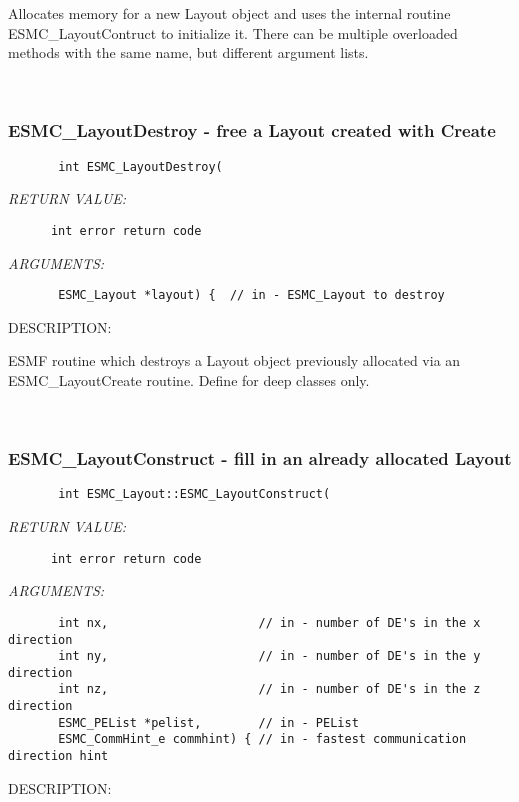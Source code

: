         Allocates memory for a new Layout
        object and uses the internal routine ESMC\_LayoutContruct to
        initialize it. There can be multiple overloaded methods with the 
        same name, but different argument lists.
   
 
\mbox{}\hrulefill\ 
 
\subsubsection{ESMC\_LayoutDestroy - free a Layout created with Create}


  
\begin{verbatim}       int ESMC_LayoutDestroy(\end{verbatim}{\em RETURN VALUE:}
\begin{verbatim}      int error return code\end{verbatim}{\em ARGUMENTS:}
\begin{verbatim}       ESMC_Layout *layout) {  // in - ESMC_Layout to destroy\end{verbatim}
{\sf DESCRIPTION:\\ }


        ESMF routine which destroys a Layout object previously allocated
        via an ESMC\_LayoutCreate routine.  Define for deep classes only.
   
 
\mbox{}\hrulefill\ 
 
\subsubsection{ESMC\_LayoutConstruct - fill in an already allocated Layout}


  
\begin{verbatim}       int ESMC_Layout::ESMC_LayoutConstruct(\end{verbatim}{\em RETURN VALUE:}
\begin{verbatim}      int error return code\end{verbatim}{\em ARGUMENTS:}
\begin{verbatim}       int nx,                     // in - number of DE's in the x direction
       int ny,                     // in - number of DE's in the y direction
       int nz,                     // in - number of DE's in the z direction
       ESMC_PEList *pelist,        // in - PEList
       ESMC_CommHint_e commhint) { // in - fastest communication direction hint\end{verbatim}
{\sf DESCRIPTION:\\ }


